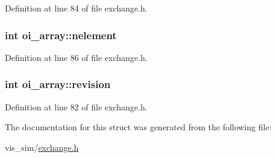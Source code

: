 Definition at line 84 of file exchange.h.

\hypertarget{structoi__array_a91e7d5e5eea710bf4c47eb891783d383}{
\subsubsection[{nelement}]{\setlength{\rightskip}{0pt plus 5cm}int {\bf oi\_\-array::nelement}}}
\label{structoi__array_a91e7d5e5eea710bf4c47eb891783d383}


Definition at line 86 of file exchange.h.

\hypertarget{structoi__array_ac04d3a51227d87b0ce8ed00998707265}{
\subsubsection[{revision}]{\setlength{\rightskip}{0pt plus 5cm}int {\bf oi\_\-array::revision}}}
\label{structoi__array_ac04d3a51227d87b0ce8ed00998707265}


Definition at line 82 of file exchange.h.



The documentation for this struct was generated from the following file:\begin{DoxyCompactItemize}
\item 
vis\_\-sim/\hyperlink{exchange_8h}{exchange.h}\end{DoxyCompactItemize}
